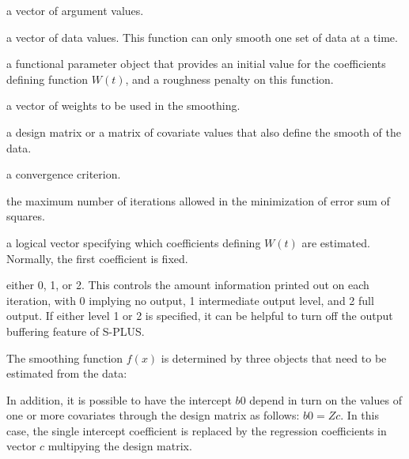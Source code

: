 \documentclass{article}
\begin{document}
\begin{Arguments}
\begin{ldescription}
\item[\code{x}] a vector of argument values.

\item[\code{y}] a vector of data values.  This function can only smooth
one set of data at a time.

\item[\code{WfdParobj}] a functional parameter object that provides an initial
value for the coefficients defining function $W(t)$,
and a roughness penalty on this function.

\item[\code{wt}] a vector of weights to be used in the smoothing.

\item[\code{zmat}] a design matrix or a matrix of covariate values that also
define the smooth of the data.

\item[\code{conv}] a convergence criterion.

\item[\code{iterlim}] the maximum number of iterations allowed in the minimization
of error sum of squares.

\item[\code{active}] a logical vector specifying which coefficients defining
$W(t)$ are estimated.  Normally, the first coefficient
is fixed.

\item[\code{dbglev}] either 0, 1, or 2.  This controls the amount information printed out on
each iteration, with 0 implying no output, 1 intermediate output level,
and 2 full output.  If either level 1 or 2 is specified, it can be
helpful to turn off the output buffering feature of S-PLUS.

\end{ldescription}
\end{Arguments}
\begin{Details}\relax
The smoothing function  $f(x)$ is determined by
three objects that need to be estimated from the data:

In addition, it is possible to have the intercept $b0$
depend in turn on the values of one or more covariates through the
design matrix  as follows:
$b0 = Z c$. In this case, the single
intercept coefficient is replaced by the regression coefficients
in vector $c$ multipying the design matrix.
\end{Details}
\end{document}
